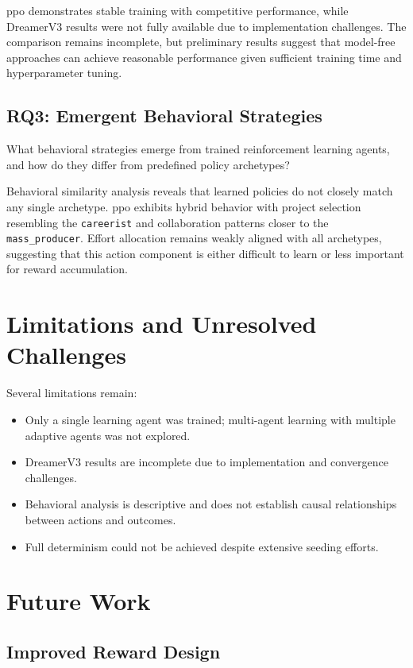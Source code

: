\documentclass[english,bachelor]{hsluthesis}
\begin{document}
\gls{ppo} demonstrates stable training with competitive performance, while DreamerV3 results were not fully available due to implementation challenges. The comparison remains incomplete, but preliminary results suggest that model-free approaches can achieve reasonable performance given sufficient training time and hyperparameter tuning.

\subsection{RQ3: Emergent Behavioral Strategies}

What behavioral strategies emerge from trained reinforcement learning agents, and how do they differ from predefined policy archetypes?

Behavioral similarity analysis reveals that learned policies do not closely match any single archetype. \gls{ppo} exhibits hybrid behavior with project selection resembling the \texttt{careerist} and collaboration patterns closer to the \texttt{mass\_producer}. Effort allocation remains weakly aligned with all archetypes, suggesting that this action component is either difficult to learn or less important for reward accumulation.

\section{Limitations and Unresolved Challenges}

Several limitations remain:

\begin{itemize}
    \item Only a single learning agent was trained; multi-agent learning with multiple adaptive agents was not explored.
    \item DreamerV3 results are incomplete due to implementation and convergence challenges.
    \item Behavioral analysis is descriptive and does not establish causal relationships between actions and outcomes.
    \item Full determinism could not be achieved despite extensive seeding efforts.
\end{itemize}

\section{Future Work}

\subsection{Improved Reward Design}
\end{document}
